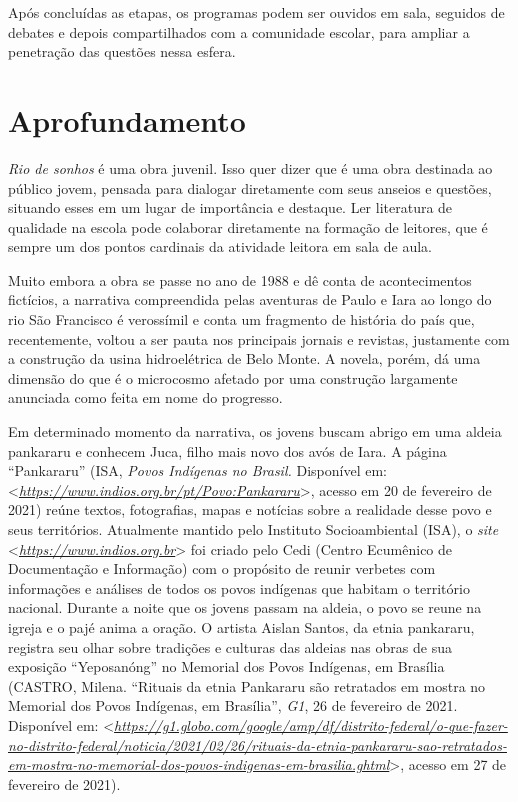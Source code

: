 \documentclass{extarticle}
\begin{document}
  Após concluídas as etapas, os programas podem ser ouvidos em sala,
  seguidos de debates e depois compartilhados com a comunidade escolar,
  para ampliar a penetração das questões nessa esfera.

  \section{Aprofundamento}

  \emph{Rio de sonhos} é uma obra juvenil. Isso quer dizer que é uma
  obra destinada ao público jovem, pensada para dialogar diretamente com
  seus anseios e questões, situando esses em um lugar de importância e
  destaque. Ler literatura de qualidade na escola pode colaborar
  diretamente na formação de leitores, que é sempre um dos pontos
  cardinais da atividade leitora em sala de aula.

  Muito embora a obra se passe no ano de 1988 e dê conta de
  acontecimentos fictícios, a narrativa compreendida pelas aventuras de
  Paulo e Iara ao longo do rio São Francisco é verossímil e conta um
  fragmento de história do país que, recentemente, voltou a ser pauta
  nos principais jornais e revistas, justamente com a construção da
  usina hidroelétrica de Belo Monte. A novela, porém, dá uma dimensão do
  que é o microcosmo afetado por uma construção largamente anunciada
  como feita em nome do progresso.

  Em determinado momento da narrativa, os jovens buscam abrigo em uma
  aldeia pankararu e conhecem Juca, filho mais novo dos avós de Iara. A
  página ``Pankararu'' (ISA, \emph{Povos Indígenas no Brasil.}
  Disponível em:
  \textless{}\href{https://www.indios.org.br/pt/Povo:Pankararu}{\emph{https://www.indios.org.br/pt/Povo:Pankararu}}\textgreater{},
  acesso em 20 de fevereiro de 2021) reúne textos, fotografias, mapas e
  notícias sobre a realidade desse povo e seus territórios. Atualmente
  mantido pelo Instituto Socioambiental (ISA), o \emph{site}
  \textless{}\href{https://www.indios.org.br/}{\emph{https://www.indios.org.br}}\textgreater{}
  foi criado pelo Cedi (Centro Ecumênico de Documentação e Informação)
  com o propósito de reunir verbetes com informações e análises de todos
  os povos indígenas que habitam o território nacional. Durante a noite
  que os jovens passam na aldeia, o povo se reune na igreja e o pajé
  anima a oração. O artista Aislan Santos, da etnia pankararu, registra
  seu olhar sobre tradições e culturas das aldeias nas obras de sua
  exposição ``Yeposanóng'' no Memorial dos Povos Indígenas, em Brasília
  (CASTRO, Milena. ``Rituais da etnia Pankararu são retratados em mostra
  no Memorial dos Povos Indígenas, em Brasília'', \emph{G1}, 26 de
  fevereiro de 2021. Disponível em:
  \textless{}\href{https://g1.globo.com/google/amp/df/distrito-federal/o-que-fazer-no-distrito-federal/noticia/2021/02/26/rituais-da-etnia-pankararu-sao-retratados-em-mostra-no-memorial-dos-povos-indigenas-em-brasilia.ghtml}{\emph{https://g1.globo.com/google/amp/df/distrito-federal/o-que-fazer-no-distrito-federal/noticia/2021/02/26/rituais-da-etnia-pankararu-sao-retratados-em-mostra-no-memorial-dos-povos-indigenas-em-brasilia.ghtml}}\textgreater{},
  acesso em 27 de fevereiro de 2021).
\end{document}
